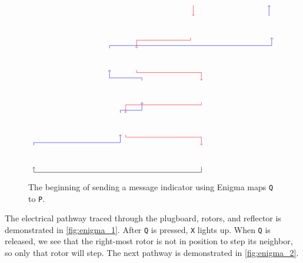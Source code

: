 \documentclass[m3380-lec-main.tex]{subfiles}
\begin{document}
\begin{exmp}
\begin{figure}[hbt]
{\[\begin{tikzpicture}[scale = 12/26]
%
\draw [->, draw=red] (16.5,0) -- (16.5,-1);
\draw [->, draw=red] (16.25,-3) -- (16.25,-3.25) -- (11.25,-3.25) -- (11.25,-4);
\draw [->, draw=red] (11.25,-6) -- (11.25,-6.25) -- (17.25,-6.25) -- (17.25,-7);
\draw [->, draw=red] (17.25,-9) -- (17.25,-9.25) -- (10.25,-9.25) -- (10.25,-10);
\draw [->, draw=red] (10.25,-12) -- (10.25,-12.25) -- (17.25,-12.25) -- (17.25,-13);
\draw [->, draw=black] (17.25,-15) -- (17.25,-15.5) -- (1.75,-15.5) -- (1.75,-15);
\draw [->, draw=blue] (1.75,-13) -- (1.75,-12.75) -- (9.75,-12.75) -- (9.75,-12);
\draw [->, draw=blue] (9.75,-10) -- (9.75,-9.75) -- (11.75, -9.75) -- (11.75,-9);
\draw [->, draw=blue] (11.75,-7) -- (11.75, -6.75) -- (8.75,-6.75) -- (8.75,-6);
\draw [->, draw=blue] (8.75,-4) -- (8.75,-3.75) -- (23.75,-3.75) -- (23.75,-3);
\draw [->, draw=blue] (23.5,-1) -- (23.5,0);
\end{tikzpicture}
\]}
\caption{\label{fig:enigma_1} The beginning of sending a message indicator using Enigma maps \texttt{Q} to \texttt{P}.}
\end{figure}
The electrical pathway traced through the plugboard, rotors, and reflector is demonstrated in \autoref{fig:enigma_1}. After \verb|Q| is pressed, \verb|X| lights up. When \verb|Q| is released, we see that the right-most rotor is not in position to step its neighbor, so only that rotor will step. The next pathway is demonstrated in \autoref{fig:enigma_2}.


\end{exmp}
\end{document}
